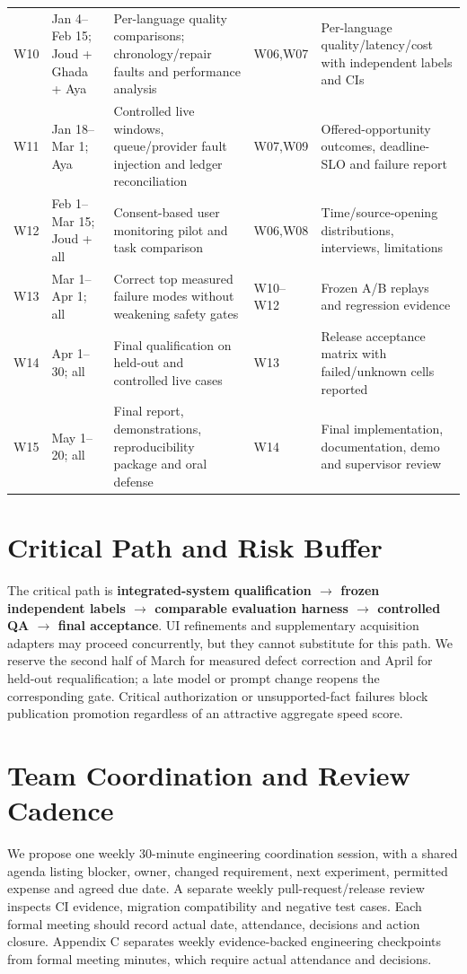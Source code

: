 \begin{longtable}{L{1.1cm}L{2.45cm}L{3.95cm}L{2.2cm}L{3.1cm}}
W10 & Jan 4--Feb 15; Joud + Ghada + Aya & Per-language quality comparisons; chronology/repair faults and performance analysis & W06,W07 & Per-language quality/latency/cost with independent labels and CIs \\
W11 & Jan 18--Mar 1; Aya & Controlled live windows, queue/provider fault injection and ledger reconciliation & W07,W09 & Offered-opportunity outcomes, deadline-SLO and failure report \\
W12 & Feb 1--Mar 15; Joud + all & Consent-based user monitoring pilot and task comparison & W06,W08 & Time/source-opening distributions, interviews, limitations \\
W13 & Mar 1--Apr 1; all & Correct top measured failure modes without weakening safety gates & W10--W12 & Frozen A/B replays and regression evidence \\
W14 & Apr 1--30; all & Final qualification on held-out and controlled live cases & W13 & Release acceptance matrix with failed/unknown cells reported \\
W15 & May 1--20; all & Final report, demonstrations, reproducibility package and oral defense & W14 & Final implementation, documentation, demo and supervisor review \\
\bottomrule\end{longtable}
\normalsize

\newpage
\section{Critical Path and Risk Buffer}
The critical path is \textbf{integrated-system qualification $\rightarrow$ frozen independent labels $\rightarrow$ comparable evaluation harness $\rightarrow$ controlled QA $\rightarrow$ final acceptance}. UI refinements and supplementary acquisition adapters may proceed concurrently, but they cannot substitute for this path. We reserve the second half of March for measured defect correction and April for held-out requalification; a late model or prompt change reopens the corresponding gate. Critical authorization or unsupported-fact failures block publication promotion regardless of an attractive aggregate speed score.

\section{Team Coordination and Review Cadence}
We propose one weekly 30-minute engineering coordination session, with a shared agenda listing blocker, owner, changed requirement, next experiment, permitted expense and agreed due date. A separate weekly pull-request/release review inspects CI evidence, migration compatibility and negative test cases. Each formal meeting should record actual date, attendance, decisions and action closure. Appendix C separates weekly evidence-backed engineering checkpoints from formal meeting minutes, which require actual attendance and decisions.
